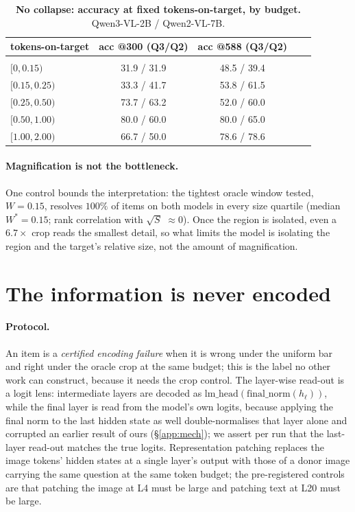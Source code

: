 \begin{table}[t]
\caption{\textbf{No collapse: accuracy at fixed tokens-on-target, by budget.} Qwen3-VL-2B /
Qwen2-VL-7B.}
\label{tab:collapse}
\begin{center}
\small
\begin{tabular}{lcccc}
\multicolumn{1}{c}{\bf tokens-on-target}  &\multicolumn{1}{c}{\bf acc @300 (Q3/Q2)} &\multicolumn{1}{c}{\bf acc @588 (Q3/Q2)}
\\ \hline \\
$[0,0.15)$ & 31.9 / 31.9 & 48.5 / 39.4\\
$[0.15,0.25)$ & 33.3 / 41.7 & 53.8 / 61.5\\
$[0.25,0.50)$ & 73.7 / 63.2 & 52.0 / 60.0\\
$[0.50,1.00)$ & 80.0 / 60.0 & 80.0 / 65.0\\
$[1.00,2.00)$ & 66.7 / 50.0 & 78.6 / 78.6\\
\end{tabular}
\end{center}
\end{table}

\paragraph{Magnification is not the bottleneck.} One control bounds the interpretation: the tightest
oracle window tested, $W{=}0.15$, resolves $100\%$ of items on both models in every size quartile
(median $W^*=0.15$; rank correlation with $\sqrt{S}$ $\approx0$). Once the region is isolated, even a
$6.7\times$ crop reads the smallest detail, so what limits the model is isolating the region and the
target's relative size, not the amount of magnification.

\section{The information is never encoded}\label{app:encoding}

\paragraph{Protocol.} An item is a \emph{certified encoding failure} when it is wrong under the
uniform bar and right under the oracle crop at the same budget; this is the label no other work can
construct, because it needs the crop control. The layer-wise read-out is a logit lens: intermediate
layers are decoded as $\mathrm{lm\_head}(\mathrm{final\_norm}(h_\ell))$, while the final layer is
read from the model's own logits, because applying the final norm to the last hidden state as well
double-normalises that layer alone and corrupted an earlier result of ours (\S\ref{app:mech}); we
assert per run that the last-layer read-out matches the true logits. Representation patching replaces
the image tokens' hidden states at a single layer's output with those of a donor image carrying the
same question at the same token budget; the pre-registered controls are that patching the image at
L4 must be large and patching text at L20 must be large.

